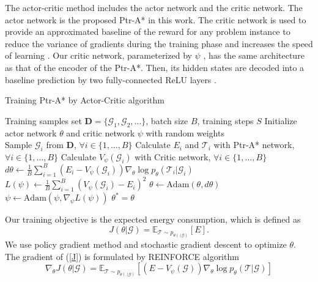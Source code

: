 \documentclass[journal]{IEEEtran}
\begin{document}
	 The actor-critic method includes the actor network and the critic network. The actor network is the proposed Ptr-A* in this work. The critic network is used to provide an approximated baseline of the reward for any problem instance to reduce the variance of gradients during the training phase and increases the speed of learning \cite{V. R. Konda}. Our critic network, parameterized by $\psi$ , has the same architecture as that of the encoder of the Ptr-A*. Then, its hidden states are decoded into a baseline prediction by two fully-connected ReLU layers \cite{I. Bello}.
	\begin{algorithm}[t!]
	\caption{Training Ptr-A* by Actor-Critic algorithm}
	\label{alg1}
	\begin{algorithmic}[1]
		\renewcommand{\algorithmicrequire}{\textbf{Input:}}
	     \REQUIRE Training samples set $\bm{D}=\{\bm{\mathcal{G}}_1, \bm{\mathcal{G}}_2, \dots\}$, batch size $B$, training steps $S$
	    \STATE Initialize actor network $\theta$ and critic network $\psi$ with random weights\\
		\STATE Sample $\bm{\mathcal{G}}_i$ from $\bm{D}$, $\forall{i}\in\{1,\dots, B\}$
		\STATE Calculate $E_i$ and $\bm{\mathcal{T}}_i$ with Ptr-A* network, $\forall{i}\in\{1,\dots, B\}$
		\STATE Calculate  $V_{\psi}\left(\bm{\mathcal{G}}_i\right)$ with Critic network, $\forall{i}\in\{1,\dots, B\}$
		\STATE $d\theta \gets \frac{1}{B} \sum_{i=1}^B \left( E_i-V_{\psi}\left(\bm{\mathcal{G}}_i\right) \right) \nabla_{\theta} \log p_{\theta} \left(\bm{\mathcal{T}}_i|\bm{\mathcal{G}}_i\right)$
		\STATE $L(\psi) \gets \frac{1}{B}\sum_{i=1}^{B}\left(V_{\psi}\left(\bm{\mathcal{G}}_i\right)-E_i \right)^2$
		\STATE $\theta \gets \text{Adam}\left(\theta, d\theta\right)$
		\STATE $\psi \gets \text{Adam}\left(\psi, \nabla_\psi L(\psi)\right)$
		\ENDFOR
		\RETURN $\theta^* = \theta$
	\end{algorithmic}
    \end{algorithm}
    Our training objective is the expected energy consumption, which is defined as
	\begin{equation}
	    \label{J}
	    J\left(\theta|\bm{\mathcal{G}}\right) = \mathbb{E}_{\bm{\mathcal{T}}\sim p_{\theta(.|\bm{\mathcal{G}})}} [E].
	\end{equation}
	We use policy gradient method and stochastic gradient descent to optimize $\theta$. The gradient of (\ref{J}) is formulated by REINFORCE\cite{R. J. Williams} algorithm
	\begin{equation}
	\label{gradient}
	    \nabla_{\theta}J\left(\theta|\bm{\mathcal{G}}\right) = \mathbb{E}_{\bm{\mathcal{T}}\sim p_{\theta(.|\bm{\mathcal{G}})}}\left[\left(E - V_{\psi}\left(\bm{\mathcal{G}}\right)\right) \nabla_{\theta}\log p_{\theta}\left( \bm{\mathcal{T}} | \bm{\mathcal{G}}\right) \right]
	\end{equation}
\end{document}
